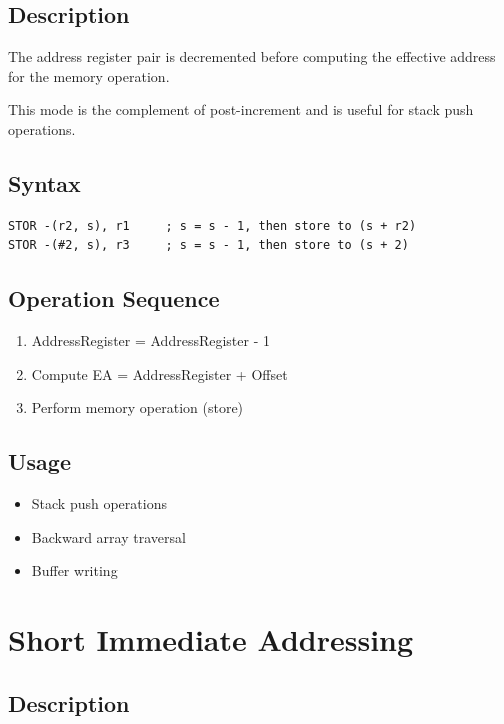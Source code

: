 \subsection{Description}

The address register pair is decremented before computing the effective address for the memory operation.

This mode is the complement of post-increment and is useful for stack push operations.

\subsection{Syntax}

\begin{lstlisting}
STOR -(r2, s), r1     ; s = s - 1, then store to (s + r2)
STOR -(#2, s), r3     ; s = s - 1, then store to (s + 2)
\end{lstlisting}

\subsection{Operation Sequence}

\begin{enumerate}
	\item AddressRegister = AddressRegister - 1
	\item Compute EA = AddressRegister + Offset
	\item Perform memory operation (store)
\end{enumerate}

\subsection{Usage}

\begin{itemize}
	\item Stack push operations
	\item Backward array traversal
	\item Buffer writing
\end{itemize}

\section{Short Immediate Addressing}

\subsection{Description}

